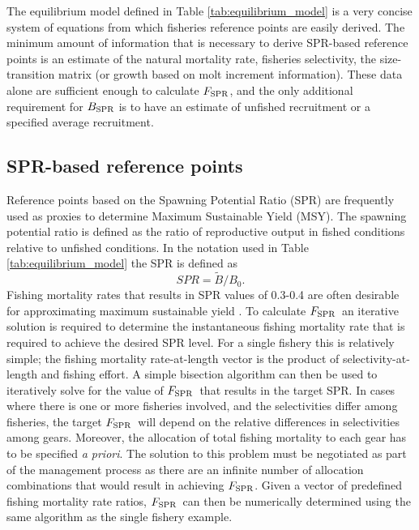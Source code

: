 \documentclass[12pt,letterpaper]{article}
\newcommand{\fspr}{$F_{\textnormal{SPR}}$}
\begin{document}
    The equilibrium model defined  in Table \ref{tab:equilibrium_model} is a very concise system of equations from which fisheries reference points are easily derived.  The minimum amount of information that is necessary to derive SPR-based reference points is an estimate of the natural mortality rate, fisheries selectivity, the size-transition matrix (or growth based on molt increment information).  These data alone are sufficient enough to calculate $F_{\rm{SPR}}$, and the only additional requirement for $B_{\rm{SPR}}$ is to have an estimate of unfished recruitment or a specified average recruitment.



    \subsection*{SPR-based reference points} %
    \label{sub:spr_based_reference_points}
    Reference points based on the Spawning Potential Ratio (SPR) are frequently used as proxies to determine Maximum Sustainable Yield (MSY).  The spawning potential ratio is defined as the ratio of reproductive output in fished conditions relative to unfished conditions.  In the notation used in Table \ref{tab:equilibrium_model} the SPR is defined as
    \begin{equation}
      SPR = \tilde{B}/B_0.
    \end{equation}
    Fishing mortality rates that results in SPR values of 0.3-0.4 are often desirable for approximating maximum sustainable yield \citep{clark2002f}.  To calculate \fspr\ an iterative solution is required to determine the instantaneous fishing mortality rate that is required to achieve the desired SPR level.  For a single fishery this is relatively simple; the fishing mortality rate-at-length vector is the product of selectivity-at-length and fishing effort.  A simple bisection algorithm can then be used to iteratively solve for the value of \fspr\ that results in the target SPR.  In cases where there is one or more fisheries involved, and the selectivities differ among fisheries, the target \fspr\ will depend on the relative differences in selectivities among gears.  Moreover, the allocation of total fishing mortality to each gear has to be specified \textit{a priori}.  The solution to this problem must be negotiated as part of the management process as there are an infinite number of allocation combinations that would result in achieving \fspr.  Given a vector of predefined fishing mortality rate ratios, \fspr\ can then be numerically determined using the same algorithm as the single fishery example.
\end{document}
